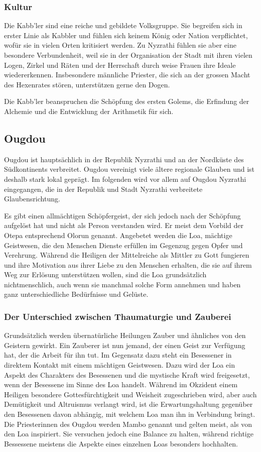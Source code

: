\documentclass[10pt,twoside,twocolumn,openany]{book}
\begin{document}
\subsubsection{Kultur}
Die Kabb'ler sind eine reiche und gebildete Volksgruppe. Sie begreifen sich in erster Linie als Kabbler und fühlen sich keinem König oder Nation verpflichtet, wofür sie in vielen Orten kritisiert werden. Zu Nyzrathi fühlen sie aber eine besondere Verbundenheit, weil sie in der Organisation der Stadt mit ihren vielen Logen, Zirkel und Räten und der Herrschaft durch weise Frauen ihre Ideale wiedererkennen. Insbesondere  männliche Priester, die sich an der grossen Macht des Hexenrates stören, unterstützen gerne den Dogen.

Die Kabb'ler beanspruchen die Schöpfung des ersten Golems, die Erfindung der Alchemie und die Entwicklung der Arithmetik für sich.

\subsection{Ougdou}

Ougdou ist hauptsächlich in der Republik Nyzrathi und an der Nordküste des Südkontinents verbreitet. Ougdou vereinigt viele ältere regionale Glauben und ist deshalb stark lokal geprägt. Im folgenden wird vor allem auf Ougdou Nyzrathi eingegangen, die in der Republik und Stadt Nyzrathi verbreitete Glaubensrichtung.

Es gibt einen allmächtigen Schöpfergeist, der sich jedoch nach der Schöpfung aufgelöst hat und nicht als Person verstanden wird. Er meist dem Vorbild der Otepa entsprechend Olorun genannt. Angebetet werden die Loa, mächtige Geistwesen, die den Menschen Dienste erfüllen im Gegenzug gegen Opfer und Verehrung. Während die Heiligen der Mittelreiche als Mittler zu Gott fungieren und ihre Motivation aus ihrer Liebe zu den Menschen erhalten, die sie auf ihrem Weg zur Erlösung unterstützen wollen, sind die Loa grundsätzlich nichtmenschlich, auch wenn sie manchmal solche Form annehmen und haben ganz unterschiedliche Bedürfnisse und Gelüste.

\subsubsection{Der Unterschied zwischen Thaumaturgie und Zauberei}
Grundsätzlich werden übernatürliche Heilungen Zauber und ähnliches von den Geistern gewirkt. Ein Zauberer ist nun jemand, der einen Geist zur Verfügung hat, der die Arbeit für ihn tut. Im Gegensatz dazu steht ein Besessener in direktem Kontakt mit einem mächtigen Geistwesen. Dazu wird der Loa ein Aspekt des Charakters des Besessenen und die mystische Kraft wird freigesetzt, wenn der Besessene im Sinne des Loa handelt. Während im Okzident einem Heiligen besondere Gottesfürchtigkeit und Weisheit zugeschrieben wird, aber auch Demütigkeit und Altruismus verlangt wird, ist die Erwartungshaltung gegenüber den Besessenen davon abhängig, mit welchem Loa man ihn in Verbindung bringt. Die Priesterinnen des Ougdou werden Mambo genannt und gelten meist, als von den Loa inspiriert. Sie versuchen jedoch eine Balance zu halten, während richtige Bessessene meistens die Aspekte eines einzelnen Loas besonders hochhalten.
\end{document}
